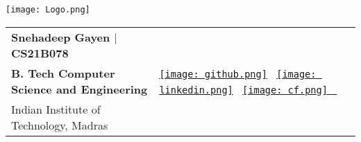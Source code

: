 \documentclass[10pt,article]{article}
\newcommand{\resheading}[1]{{\small \colorbox{myblue} { \begin{minipage}{\dimexpr\linewidth-2\fboxsep}\centering{\textbf{#1 \vphantom{p\^{E}}}}\end{minipage}}}}
\newcommand{\myfont}[2]{\fontsize{#1}{#1}\selectfont #2}
\newcommand{\subheadingfont}[1]{\myfont{11pt}{#1}}
\begin{document}
\begin{table}
    \begin{minipage}{0\linewidth}
        \centering
        \texttt{[image: Logo.png]}
    \end{minipage}
    \begin{minipage}{0.9\linewidth}
        \setlength{\tabcolsep}{70pt}
        \def\arraystretch{1.1}
        \begin{tabular}{l l r}
            \textbf{\Large{Snehadeep Gayen $\vert$ CS21B078}} &
            \multirow{3}{*}{     {\href{https://github.com/Snehadeep-Gayen}{\texttt{[image: github.png]}} \ 
 \href{https://www.linkedin.com/in/snehadeep-gayen/}{\texttt{[image: linkedin.png]}} \ \href{https://codeforces.com/profile/Snehadeep}{\texttt{[image: cf.png]} \ } 
            }}
            \\
            \textbf{B. Tech Computer Science and Engineering} 
            \\
            {Indian Institute of Technology, Madras} 
            \\
        \end{tabular}
    \end{minipage}\hfill
\end{table}


\end{document}
